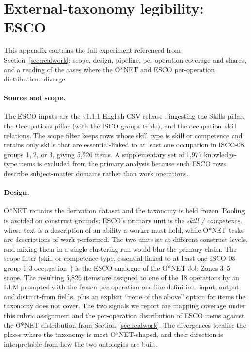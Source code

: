 \documentclass{article}
\begin{document}
\section{External-taxonomy legibility: ESCO}
\label{app:esco}

This appendix contains the full experiment referenced from Section~\ref{sec:realwork}: scope, design, pipeline, per-operation coverage and shares, and a reading of the cases where the O{*}NET and ESCO per-operation distributions diverge.

\paragraph{Source and scope.} The ESCO inputs are the v1.1.1 English CSV release \citep{esco2022v111}, ingesting the Skills pillar, the Occupations pillar (with the ISCO groups table), and the occupation--skill relations.
The scope filter keeps rows whose skill type is skill or competence and retains only skills that are essential-linked to at least one occupation in ISCO-08 groups 1, 2, or 3, giving 5{,}826 items.
A supplementary set of 1{,}977 knowledge-type items is excluded from the primary analysis because such ESCO rows describe subject-matter domains rather than work operations.

\paragraph{Design.} O{*}NET remains the derivation dataset and the taxonomy is held frozen.
Pooling is avoided on construct grounds: ESCO's primary unit is the \emph{skill / competence}, whose text is a description of an ability a worker must hold, while O{*}NET tasks are descriptions of work performed.
The two units sit at different construct levels, and mixing them in a single clustering run would blur the primary claim.
The scope filter (skill or competence type, essential-linked to at least one ISCO-08 group 1-3 occupation~\citep{ilo2012isco08}) is the ESCO analogue of the O{*}NET Job Zones 3--5 scope.
The resulting 5{,}826 items are assigned to one of the 18 operations by an LLM prompted with the frozen per-operation one-line definition, input, output, and distinct-from fields, plus an explicit ``none of the above'' option for items the taxonomy does not cover.
The two signals we report are mapping coverage under this rubric assignment and the per-operation distribution of ESCO items against the O{*}NET distribution from Section~\ref{sec:realwork}.
The divergences localise the places where the taxonomy is most O{*}NET-shaped, and their direction is interpretable from how the two ontologies are built.
\end{document}
